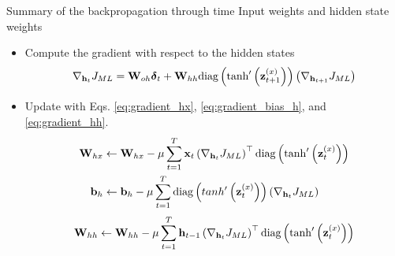 \documentclass{beamer}
\begin{document}
\begin{frame}{Summary of the backpropagation through time}
{Input weights and hidden state weights}
\begin{itemize}
    \item Compute the gradient with respect to the hidden states
    \begin{equation}\label{eq:gradient_h_t}
    \nabla_{{\bf h}_t}J_{ML}={\bf W}_{oh}{\boldsymbol \delta}_{t} + {\bf W}_{hh}  \text{diag}\left(\text{tanh}'\left({\bf z}^{(x)}_{t+1}\right)\right)\left(\nabla_{{\bf h}_{t+1}}J_{ML} \right)
\end{equation}
\item Update with Eqs. \eqref{eq:gradient_hx}, \eqref{eq:gradient_bias_h}, and \eqref{eq:gradient_hh}. 
\begin{equation}
\begin{split}
    {\bf W}_{hx} & \leftarrow {\bf W}_{hx} - \mu \sum_{t=1}^T {\bf x}_t   \left(\nabla_{{\bf h}_t} J_{ML}\right)^\top\text{diag}\left( \tanh'\left({\bf z}^{(x)}_t\right) \right)\\
    {\bf b}_{h} & \leftarrow {\bf b}_{h} - \mu \sum_{t=1}^T \text{diag}\left( tanh'\left({\bf z}^{(x)}_t\right) \right)\left(\nabla_{{\bf h}_t} J_{ML}\right)
\end{split}
\end{equation}
\begin{equation}
    {\bf W}_{hh} \leftarrow {\bf W}_{hh} -\mu \sum_{t=1}^T {\bf h}_{t-1} \left(\nabla_{{\bf h}_t} J_{ML}\right)^\top  \text{diag}\left( \tanh'\left({\bf z}^{(x)}_t\right) \right) 
\end{equation}
\end{itemize}
\end{frame}
\end{document}
